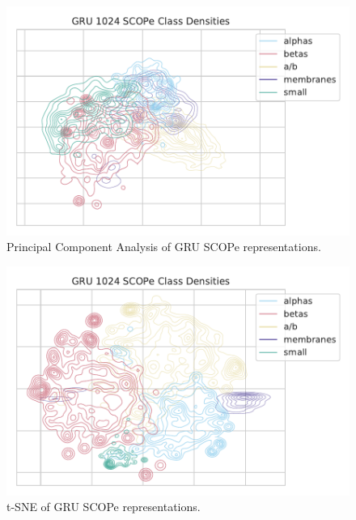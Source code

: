 \documentclass[a4paper,12pt]{article}
\begin{document}
\begin{minipage}{\linewidth}
\begin{minipage}{\linewidth}
\begin{minipage}{0.48\linewidth}
	\end{minipage}
\end{minipage}
	\vfill
	\vspace{1cm}
\begin{minipage}{\linewidth}
	\centering
	\begin{minipage}{0.48\linewidth}
		\begin{figure}[H]
			\includegraphics[width=\linewidth]{figures/fig2c_GRU_1024_no_trunc_PCA.pdf}
			\caption{Principal Component Analysis of GRU SCOPe representations.}
			\label{fig:GRU_pca_compare}
		\end{figure}
	\end{minipage}
	\hfill
	\begin{minipage}{0.48\linewidth}
		\begin{figure}[H]
			\includegraphics[width=\linewidth]{figures/fig2c_GRU_1024_no_trunc.pdf}
			\caption{t-SNE of GRU SCOPe representations.}

\end{figure}
\end{minipage}
\end{minipage}
\end{minipage}
\end{document}
